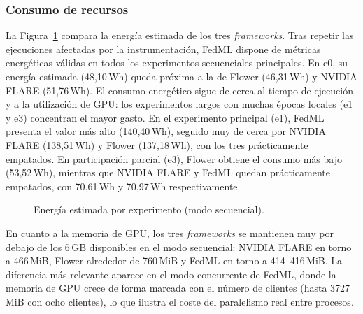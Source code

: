 \subsubsection{Consumo de recursos}\label{sec:comp-recursos}

La Figura~\ref{fig:comp-energia} compara la energía estimada de los tres \textit{frameworks}.
Tras repetir las ejecuciones afectadas por la instrumentación, FedML dispone de métricas
energéticas válidas en todos los experimentos secuenciales principales. En e0, su energía
estimada (48{,}10\,Wh) queda próxima a la de Flower (46{,}31\,Wh) y NVIDIA FLARE (51{,}76\,Wh). El
consumo energético sigue de cerca al tiempo de ejecución y a la utilización de GPU: los
experimentos largos con muchas épocas locales (e1 y e3) concentran el mayor gasto. En el
experimento principal (e1), FedML presenta el valor más alto (140{,}40\,Wh), seguido muy de cerca
por NVIDIA FLARE (138{,}51\,Wh) y Flower (137{,}18\,Wh), con los tres prácticamente empatados. En
participación parcial (e3),
Flower obtiene el consumo más bajo (53{,}52\,Wh), mientras que NVIDIA FLARE y FedML quedan
prácticamente empatados, con 70{,}61\,Wh y 70{,}97\,Wh respectivamente.

\begin{figure}[htbp]
  \centering
  \caption{Energía estimada por experimento (modo secuencial).}
  \label{fig:comp-energia}
\end{figure}

En cuanto a la memoria de GPU, los tres \textit{frameworks} se mantienen muy por debajo de los
6\,GB disponibles en el modo secuencial: NVIDIA FLARE en torno a 466\,MiB, Flower alrededor de
760\,MiB y FedML en torno a 414--416\,MiB. La diferencia más relevante
aparece en el modo concurrente de FedML, donde la memoria de GPU crece de forma marcada con el
número de clientes (hasta 3727\,MiB con ocho clientes), lo que ilustra el coste del paralelismo
real entre procesos.

